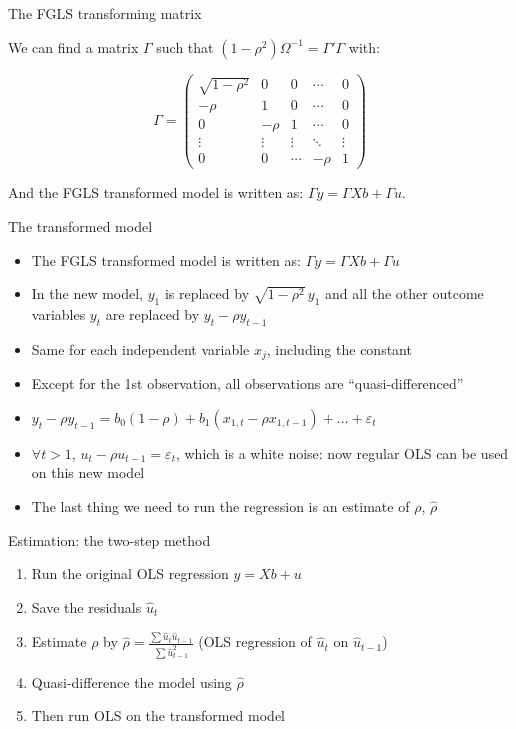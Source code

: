 \documentclass[aspectratio=169]{beamer}
\begin{document}
\begin{frame}{The FGLS transforming matrix}

We can find a matrix $\Gamma$ such that $(1-\rho^2)\Omega^{-1} = \Gamma'\Gamma$ with:

\[
\Gamma = \begin{pmatrix}
\sqrt{1-\rho^2} & 0 & 0 & \cdots & 0\\
-\rho & 1 & 0 & \cdots & 0\\
0 & -\rho & 1 & \cdots & 0\\
\vdots & \vdots & \vdots & \ddots & \vdots\\
0 & 0 & \cdots & -\rho & 1
\end{pmatrix}
\]

And the FGLS transformed model is written as: $\Gamma y = \Gamma Xb + \Gamma u$.

\end{frame}

\begin{frame}{The transformed model}

\begin{itemize}
    \item The FGLS transformed model is written as: $\Gamma y = \Gamma Xb + \Gamma u$
    \item In the new model, $y_1$ is replaced by $\sqrt{1-\rho^2}\,y_1$ and all the other outcome variables $y_t$ are replaced by $y_t - \rho y_{t-1}$
    \item Same for each independent variable $x_j$, including the constant
    \item Except for the 1st observation, all observations are ``quasi-differenced''
    \item $y_t - \rho y_{t-1} = b_0(1-\rho) + b_1(x_{1,t} - \rho x_{1,t-1}) + \dots + \varepsilon_t$
    \item $\forall t > 1$, $u_t - \rho u_{t-1} = \varepsilon_t$, which is a white noise: now regular OLS can be used on this new model
    \item The last thing we need to run the regression is an estimate of $\rho$, $\hat{\rho}$
\end{itemize}

\end{frame}

\begin{frame}{Estimation: the two-step method}

\begin{enumerate}
    \item Run the original OLS regression $y = Xb + u$
    \item Save the residuals $\hat{u}_t$
    \item Estimate $\rho$ by $\hat{\rho} = \frac{\sum \hat{u}_t \hat{u}_{t-1}}{\sum \hat{u}_{t-1}^2}$ (OLS regression of $\hat{u}_t$ on $\hat{u}_{t-1}$)
    \item Quasi-difference the model using $\hat{\rho}$
    \item Then run OLS on the transformed model
\end{enumerate}

\end{frame}
\end{document}
